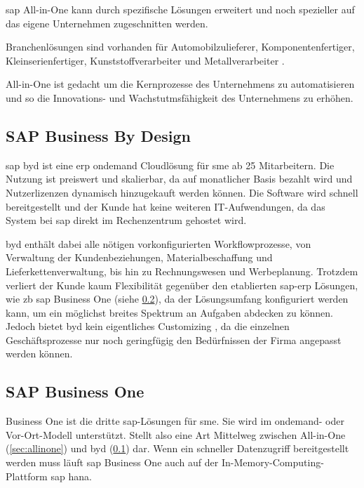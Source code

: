 \gls{sap} All-in-One kann durch spezifische Lösungen erweitert und noch spezieller auf das eigene Unternehmen zugeschnitten werden.

Branchenlösungen sind vorhanden für Automobilzulieferer, Komponentenfertiger, Kleinserienfertiger, Kunststoffverarbeiter und Metallverarbeiter \cite{AiOBeratung}.

All-in-One ist gedacht um die Kernprozesse des Unternehmens zu automatisieren und so die Innovations- und Wachstutmsfähigkeit des Unternehmens zu erhöhen.

\subsection{SAP Business By Design}
\label{sec:byd}

\gls{sap} \gls{byd} ist eine \gls{erp} \gls{ondemand} Cloudlösung für \gls{sme} ab 25 Mitarbeitern. Die Nutzung ist preiswert und skalierbar, da auf monatlicher Basis bezahlt wird und Nutzerlizenzen dynamisch hinzugekauft werden können. Die Software wird schnell bereitgestellt und der Kunde hat keine weiteren IT-Aufwendungen, da das System bei \gls{sap} direkt im Rechenzentrum gehostet wird.

\gls{byd} enthält dabei alle nötigen vorkonfigurierten Workflowprozesse, von Verwaltung der Kundenbeziehungen, Materialbeschaffung und Lieferkettenverwaltung, bis hin zu Rechnungswesen und Werbeplanung. Trotzdem verliert der Kunde kaum Flexibilität gegenüber den etablierten \gls{sap}-\gls{erp} Lösungen, wie \gls{zb} \gls{sap} Business One (siehe \ref{sec:business-one}), da der Lösungsumfang konfiguriert werden kann, um ein möglichst breites Spektrum an Aufgaben abdecken zu können. Jedoch bietet \gls{byd} kein eigentliches Customizing \cite{ERP4Students}, da die einzelnen Geschäftsprozesse nur noch geringfügig den Bedürfnissen der Firma angepasst werden können.

\subsection{SAP Business One}
\label{sec:business-one}

Business One ist die dritte \gls{sap}-Lösungen für \gls{sme}. Sie wird im \gls{ondemand}- oder Vor-Ort-Modell unterstützt. Stellt also eine Art Mittelweg zwischen All-in-One (\ref{sec:allinone}) und \gls{byd} (\ref{sec:byd}) dar. Wenn ein schneller Datenzugriff bereitgestellt werden muss läuft \gls{sap} Business One auch auf der In-Memory-Computing-Plattform \gls{sap} \gls{hana}.

